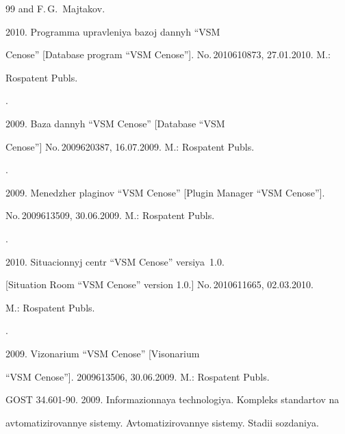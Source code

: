{{\begin{thebibliography}{99}
{and F.\,G.~Majtakov}.


2010. Programma upravleniya bazoj dannyh ``VSM 


Cenose'' [Database program ``VSM Cenose'']. No.\,2010610873, 27.01.2010. M.: 


Rospatent Publs. 







. 


2009. Baza dannyh ``VSM Cenose'' [Database ``VSM 


Cenose''] No.\,2009620387, 16.07.2009. M.: Rospatent Publs. 







.


2009. Menedzher plaginov ``VSM Cenose'' [Plugin Manager ``VSM Cenose'']. 


No.\,2009613509, 30.06.2009. M.: Rospatent Publs. 







.


2010. Situacionnyj centr  ``VSM Cenose'' versiya~1.0. 


[Situation Room ``VSM Cenose'' version 1.0.] No.\,2010611665, 02.03.2010. 


M.: Rospatent Publs. 







. 


2009. Vizonarium ``VSM Cenose'' [Visonarium 


``VSM Cenose'']. 2009613506, 30.06.2009. M.: Rospatent Publs. 




GOST 34.601-90. 2009. Informazionnaya technologiya. Kompleks standartov na 


avtomatizirovannye sistemy. Avtomatizirovannye sistemy. Stadii sozdaniya.



\end{thebibliography}}}
